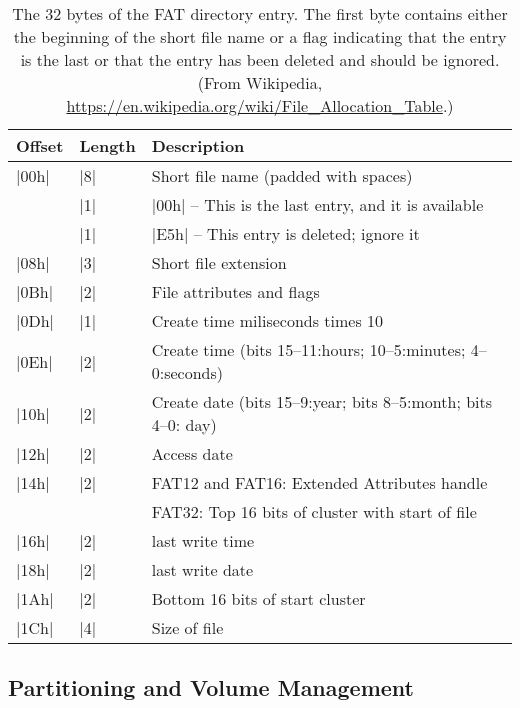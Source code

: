 \begin{table}
\begin{minipage}{\textwidth}
\caption{The 32 bytes of the FAT directory entry. The first byte
  contains either the beginning of the short file name or a flag
  indicating that the entry is the last or that the entry has been
  deleted and should be ignored. (From Wikipedia, \url{https://en.wikipedia.org/wiki/File\_Allocation\_Table}.)}\label{table:fatdir}
\begin{center}
\begin{tabular}{lll}
\hline
Offset & Length & Description \\
\hline
|00h| & |8| & Short file name (padded with spaces) \\
      & |1| & |00h| -- This is the last entry, and it is available \\
      & |1| & |E5h| -- This entry is deleted; ignore it \\
\hline
|08h| & |3| & Short file extension \\
\hline
|0Bh| & |2| & File attributes and flags\\
\hline
|0Dh| & |1| & Create time miliseconds times 10\\
\hline
|0Eh| & |2| & Create time (bits 15--11:hours; 10--5:minutes; 4--0:seconds)\\
\hline
|10h| & |2| & Create date (bits 15--9:year; bits 8--5:month; bits 4--0: day)\\
\hline
|12h| & |2| & Access date \\
\hline
|14h| & |2| & FAT12 and FAT16: Extended Attributes handle\\

      &     & FAT32: Top 16 bits of cluster with start of file\\
\hline
|16h| & |2| & last write time\\
\hline
|18h| & |2| & last write date\\
\hline
|1Ah| & |2| & Bottom 16 bits of start cluster\\
\hline
|1Ch| & |4| & Size of file\\
\hline
\end{tabular}
\end{center}
\end{minipage}
\end{table}





\subsection{Partitioning and Volume Management}

